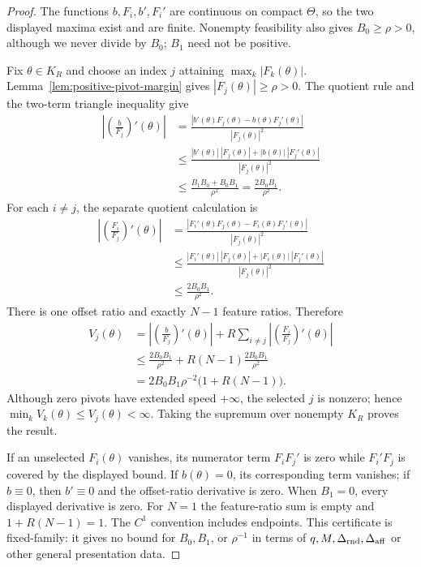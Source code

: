 \begin{proof}
The functions $b,F_i,b',F_i'$ are continuous on compact $\Theta$, so the
two displayed maxima exist and are finite.  Nonempty feasibility also gives
$B_0\geq\rho>0$, although we never divide by $B_0$; $B_1$ need not be
positive.

Fix $\theta\in K_R$ and choose an index $j$ attaining
$\max_k|F_k(\theta)|$.  Lemma~\ref{lem:positive-pivot-margin} gives
$|F_j(\theta)|\geq\rho>0$.  The quotient rule and the two-term triangle
inequality give
\[
\begin{aligned}
\left|\left(\frac b{F_j}\right)'(\theta)\right|
&=\frac{|b'(\theta)F_j(\theta)-b(\theta)F_j'(\theta)|}
{|F_j(\theta)|^2}\\
&\leq\frac{|b'(\theta)|\,|F_j(\theta)|
 +|b(\theta)|\,|F_j'(\theta)|}{|F_j(\theta)|^2}\\
&\leq\frac{B_1B_0+B_0B_1}{\rho^2}
=\frac{2B_0B_1}{\rho^2}.
\end{aligned}
\]
For each $i\neq j$, the separate quotient calculation is
\[
\begin{aligned}
\left|\left(\frac{F_i}{F_j}\right)'(\theta)\right|
&=\frac{|F_i'(\theta)F_j(\theta)-F_i(\theta)F_j'(\theta)|}
{|F_j(\theta)|^2}\\
&\leq\frac{|F_i'(\theta)|\,|F_j(\theta)|
 +|F_i(\theta)|\,|F_j'(\theta)|}{|F_j(\theta)|^2}\\
&\leq\frac{2B_0B_1}{\rho^2}.
\end{aligned}
\]
There is one offset ratio and exactly $N-1$ feature ratios.  Therefore
\[
\begin{aligned}
V_j(\theta)
&=\left|\left(\frac b{F_j}\right)'(\theta)\right|
 +R\sum_{i\neq j}\left|\left(\frac{F_i}{F_j}\right)'(\theta)\right|\\
&\leq\frac{2B_0B_1}{\rho^2}
 +R(N-1)\frac{2B_0B_1}{\rho^2}\\
&=2B_0B_1\rho^{-2}\bigl(1+R(N-1)\bigr).
\end{aligned}
\]
Although zero pivots have extended speed $+\infty$, the selected $j$ is
nonzero; hence $\min_kV_k(\theta)\leq V_j(\theta)<\infty$.  Taking the
supremum over nonempty $K_R$ proves the result.

If an unselected $F_i(\theta)$ vanishes, its numerator term
$F_iF_j'$ is zero while $F_i'F_j$ is covered by the displayed bound.  If
$b(\theta)=0$, its corresponding term vanishes; if $b\equiv0$, then
$b'\equiv0$ and the offset-ratio derivative is zero.  When $B_1=0$, every
displayed derivative is zero.  For $N=1$ the feature-ratio sum is empty and
$1+R(N-1)=1$.  The $C^1$ convention includes endpoints.  This certificate
is fixed-family: it gives no bound for $B_0,B_1$, or $\rho^{-1}$ in terms of
$q,M,\Delta_{\rm rnd},\Delta_{\rm aff}$ or other general presentation data.
\end{proof}

